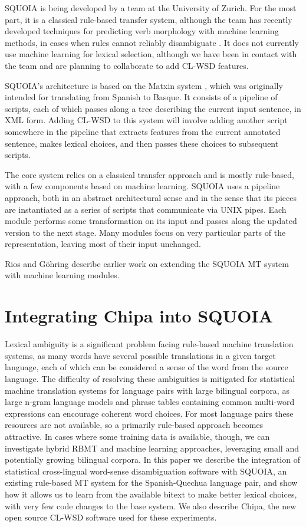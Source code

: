 SQUOIA is being developed by a team at the University of Zurich. For the most
part, it is a classical rule-based transfer system, although the team has
recently developed techniques for predicting verb morphology with machine
learning methods, in cases when rules cannot reliably disambiguate
\cite{riosgonzales-gohring:2013:HyTra}. It does not currently use machine
learning for lexical selection, although we have been in contact with the team
and are planning to collaborate to add CL-WSD features.

SQUOIA's architecture is based on the Matxin system \cite{matxin2005}, which
was originally intended for translating from Spanish to Basque.
It consists of a pipeline of scripts, each of which passes along a tree
describing the current input sentence, in XML form. Adding CL-WSD to this
system will involve adding another script somewhere in the pipeline that
extracts features from the current annotated sentence, makes lexical choices,
and then passes these choices to subsequent scripts.

The core system relies on a classical transfer approach and is mostly
rule-based, with a few components based on machine learning.
SQUOIA uses a pipeline approach, both in an abstract architectural sense and in
the sense that its pieces are instantiated as a series of scripts that communicate
via UNIX pipes. Each module performs some transformation on its input and
passes along the updated version to the next stage. Many modules focus on very
particular parts of the representation, leaving most of their input unchanged.

Rios and G\"{o}hring \cite{riosgonzales-gohring:2013:HyTra} describe
earlier work on extending the SQUOIA MT system with machine learning modules.

\section{Integrating Chipa into SQUOIA}

Lexical ambiguity is a significant problem facing rule-based machine
translation systems, as many words have several possible translations in a
given target language, each of which can be considered a sense of the word from
the source language.
The difficulty of resolving these ambiguities is mitigated for 
statistical machine translation systems for language pairs with large bilingual
corpora, as large n-gram language models and phrase tables containing common
multi-word expressions can encourage coherent word choices.
For most language pairs these resources are not available, so a primarily
rule-based approach becomes attractive.
In cases where some training data is available, though, we can
investigate hybrid RBMT and machine learning approaches, leveraging small and
potentially growing bilingual corpora. In this paper we
describe the integration of statistical cross-lingual word-sense disambiguation
software with SQUOIA, an existing rule-based MT system for the Spanish-Quechua
language pair, and show how it allows us to learn from the available bitext to
make better lexical choices, with very few code changes to the base system. We
also describe Chipa, the new open source CL-WSD software used for these
experiments.


